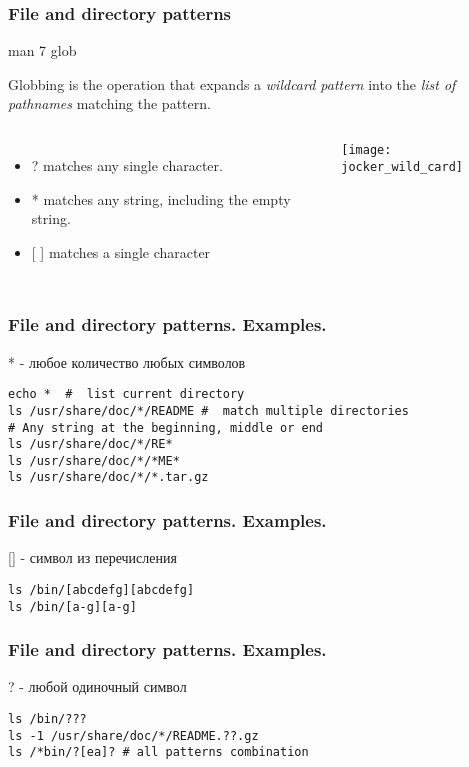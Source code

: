 \begin{frame}[fragile]
	\frametitle{File and directory patterns}
	man 7 glob
	\begin{block}{Globbing}
		is the operation that expands a \textit{wildcard pattern} into the \textit{list of pathnames} matching the pattern.  
	\end{block}
    \begin{columns}
  \begin{itemize}
    \item \alert{?} matches any single character.
    \item \alert{*} matches any string, including the empty string.
    \item \alert{[ ]} matches a single character
  \end{itemize}
            \center\texttt{[image: jocker\_wild\_card]}
    \end{columns} 
\end{frame}

\begin{frame}[fragile]
	\frametitle{File and directory patterns. Examples.}
    \alert{*} - любое количество любых символов
\begin{lstlisting}[basicstyle=\normalsize]
echo *  #  list current directory
ls /usr/share/doc/*/README #  match multiple directories
# Any string at the beginning, middle or end
ls /usr/share/doc/*/RE*
ls /usr/share/doc/*/*ME*
ls /usr/share/doc/*/*.tar.gz
\end{lstlisting} 
\end{frame}

\begin{frame}[fragile]
	\frametitle{File and directory patterns. Examples.}
  \alert{[]} - символ из перечисления
\begin{lstlisting}[basicstyle=\normalsize]
ls /bin/[abcdefg][abcdefg]
ls /bin/[a-g][a-g]
\end{lstlisting}
\end{frame}

\begin{frame}[fragile]
	\frametitle{File and directory patterns. Examples.}
    \alert{?} - любой одиночный символ
\begin{lstlisting}[basicstyle=\normalsize]
ls /bin/???
ls -1 /usr/share/doc/*/README.??.gz
ls /*bin/?[ea]? # all patterns combination
\end{lstlisting} 
\end{frame}

